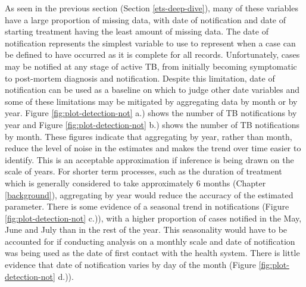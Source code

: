 \documentclass[11pt,twoside]{bristolthesis}
\begin{document}
  As seen in the previous section (Section \ref{ets-deep-dive}), many of these variables have a large proportion of missing data, with date of notification and date of starting treatment having the least amount of missing data. The date of notification represents the simplest variable to use to represent when a case can be defined to have occurred as it is complete for all records. Unfortunately, cases may be notified at any stage of active TB, from initially becoming symptomatic to post-mortem diagnosis and notification. Despite this limitation, date of notification can be used as a baseline on which to judge other date variables and some of these limitations may be mitigated by aggregating data by month or by year. Figure \ref{fig:plot-detection-not} a.) shows the number of TB notifications by year and Figure \ref{fig:plot-detection-not} b.) shows the number of TB notifications by month. These figures indicate that aggregating by year, rather than month, reduce the level of noise in the estimates and makes the trend over time easier to identify. This is an acceptable approximation if inference is being drawn on the scale of years. For shorter term processes, such as the duration of treatment which is generally considered to take approximately 6 months (Chapter \ref{background}), aggregating by year would reduce the accuracy of the estimated parameter. There is some evidence of a seasonal trend in notifications (Figure \ref{fig:plot-detection-not} c.)), with a higher proportion of cases notified in the May, June and July than in the rest of the year. This seasonality would have to be accounted for if conducting analysis on a monthly scale and date of notification was being used as the date of first contact with the health system. There is little evidence that date of notification varies by day of the month (Figure \ref{fig:plot-detection-not} d.)).
\end{document}
